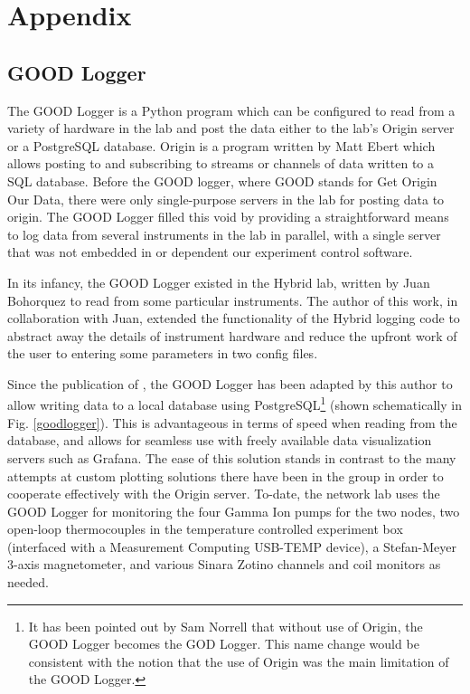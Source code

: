 \part{Appendix}\label{part:appendices}
\chapter{GOOD Logger}\label{ch:template}

The GOOD Logger is a Python program which can be configured to read from a variety of hardware in the lab and post the data either to the lab's Origin server or a PostgreSQL database. Origin is a program written by Matt Ebert which allows posting to and subscribing to streams or channels of data written to a SQL database. Before the GOOD logger, where GOOD stands for Get Origin Our Data, there were only single-purpose servers in the lab for posting data to origin. The GOOD Logger filled this void by providing a straightforward means to log data from several instruments in the lab in parallel, with a single server that was not embedded in or dependent our experiment control software. 

In its infancy, the GOOD Logger existed in the Hybrid lab, written by Juan Bohorquez to read from some particular instruments. The author of this work, in collaboration with Juan, extended the functionality of the Hybrid logging code to abstract away the details of instrument hardware and reduce the upfront work of the user to entering some parameters in two config files.

Since the publication of \cite{Bohorquez2023}, the GOOD Logger has been adapted by this author to allow writing data to a local database using PostgreSQL\footnote{It has been pointed out by Sam Norrell that without use of Origin, the GOOD Logger becomes the GOD Logger. This name change would be consistent with the notion that the use of Origin was the main limitation of the GOOD Logger.} (shown schematically in Fig. \ref{goodlogger}). This is advantageous in terms of speed when reading from the database, and allows for seamless use with freely available data visualization servers such as Grafana. The ease of this solution stands in contrast to the many attempts at custom plotting solutions there have been in the group in order to cooperate effectively with the Origin server. To-date, the network lab uses the GOOD Logger for monitoring the four Gamma Ion pumps for the two nodes, two open-loop thermocouples in the temperature controlled experiment box (interfaced with a Measurement Computing USB-TEMP device), a Stefan-Meyer 3-axis magnetometer, and various Sinara Zotino channels and coil monitors as needed.

